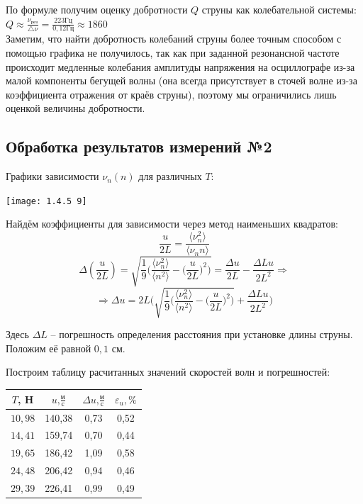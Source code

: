 \documentclass[a4paper, 12pt]{article} %
\begin{document}
По формуле получим оценку добротности $Q$ струны как колебательной системы: $Q \approx \frac{\nu_{\textbf{рез}}}{\bigtriangleup \nu} = \frac{223 \text{Гц}}{0,12 \text{Гц}} \approx 1860$\\

Заметим, что найти добротность колебаний струны более точным способом с помощью графика не получилось, так как при заданной резонансной частоте происходит медленные колебания амплитуды напряжения на осциллографе из-за малой компоненты бегущей волны (она всегда присутствует в сточей волне из-за коэффициента отражения от краёв струны), поэтому мы ограничились лишь оценкой величины добротности.

\newpage

\subsection{Обработка результатов измерений №2}

Графики зависимости $\nu_n(n)$ для различных $T$:

\begin{center}
    \texttt{[image: 1.4.5 9]}
\end{center}

Найдём коэффициенты для зависимости через метод наименьших квадратов:
\[\frac{u}{2L} = \frac{\langle \nu^2_n \rangle}{\langle \nu_n n \rangle}\]
\[\Delta(\frac{u}{2L}) = \sqrt{\frac{1}{9}\Big( \frac{\langle \nu^2_n \rangle}{\langle n^2 \rangle} - \Big(\frac{u}{2L}\Big)^2\Big)} = \frac{\Delta u}{2L} - \frac{\Delta L u}{2L^2} \Rightarrow\]
\[\Rightarrow \Delta u = 2L 
\Big( \sqrt{\frac{1}{9}\Big( \frac{\langle \nu^2_n \rangle}{\langle n^2 \rangle} - \Big(\frac{u}{2L}\Big)^2\Big)} + \frac{\Delta L u}{2L^2}\Big)\]

Здесь $\Delta L$ -- погрешность определения расстояния при установке длины струны. Положим её равной $0,1$ см.
 
Построим таблицу расчитанных значений скоростей волн и погрешностей:
\begin{center}

\begin{tabular}{|c|c|c|c|}
\hline 
$T$, H & $u\textbf{,} \frac{\textbf{м}}{\textbf{с}}$ & $\Delta u\textbf{,} \frac{\textbf{м}}{\textbf{с}}$ & $\varepsilon_{u}, \% $ \\ 
\hline 
$10,98$ & 140,38 & 0,73 & 0,52 \\ 
\hline 
$14,41$ & 159,74 & 0,70 & 0,44 \\ 
\hline 
$19,65$ & 186,42 & 1,09 & 0,58 \\ 
\hline 
$24,48$ & 206,42 & 0,94 & 0,46 \\ 
\hline 
$29,39$ & 226,41 & 0,99 & 0,49 \\ 
\hline 
\end{tabular}
\end{center} 
\[ \]
\end{document}
